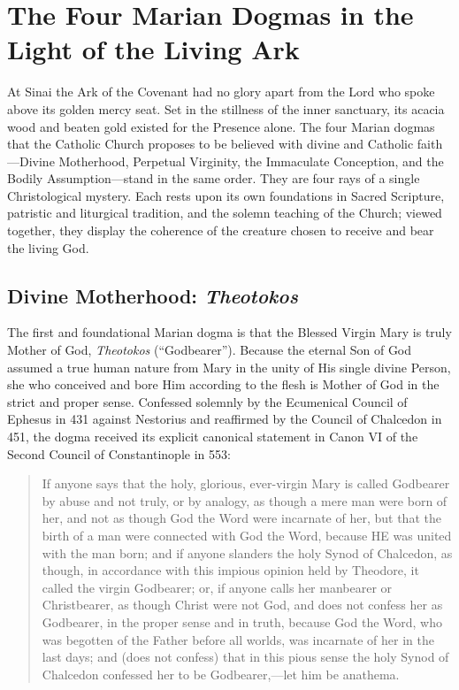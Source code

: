\section{The Four Marian Dogmas in the Light of the Living Ark}\label{sec:four-marian-dogmas}

At Sinai the Ark of the Covenant had no glory apart from the Lord who spoke above its golden mercy seat. Set in the stillness of the inner sanctuary, its acacia wood and beaten gold existed for the Presence alone. The four Marian dogmas that the Catholic Church proposes to be believed with divine and Catholic faith---Divine Motherhood, Perpetual Virginity, the Immaculate Conception, and the Bodily Assumption---stand in the same order. They are four rays of a single Christological mystery. Each rests upon its own foundations in Sacred Scripture, patristic and liturgical tradition, and the solemn teaching of the Church; viewed together, they display the coherence of the creature chosen to receive and bear the living God.

\subsection{Divine Motherhood: \textit{Theotokos}}\label{subsec:theotokos}

The first and foundational Marian dogma is that the Blessed Virgin Mary is truly Mother of God, \textit{Theotokos} (``Godbearer''). Because the eternal Son of God assumed a true human nature from Mary in the unity of His single divine Person, she who conceived and bore Him according to the flesh is Mother of God in the strict and proper sense. Confessed solemnly by the Ecumenical Council of Ephesus in 431 against Nestorius and reaffirmed by the Council of Chalcedon in 451, the dogma received its explicit canonical statement in Canon VI of the Second Council of Constantinople in 553:

\begin{quote}\small
If anyone says that the holy, glorious, ever-virgin Mary is called Godbearer by abuse and not truly, or by analogy, as though a mere man were born of her, and not as though God the Word were incarnate of her, but that the birth of a man were connected with God the Word, because HE was united with the man born; and if anyone slanders the holy Synod of Chalcedon, as though, in accordance with this impious opinion held by Theodore, it called the virgin Godbearer; or, if anyone calls her manbearer or Christbearer, as though Christ were not God, and does not confess her as Godbearer, in the proper sense and in truth, because God the Word, who was begotten of the Father before all worlds, was incarnate of her in the last days; and (does not confess) that in this pious sense the holy Synod of Chalcedon confessed her to be Godbearer,---let him be anathema.
\end{quote}


